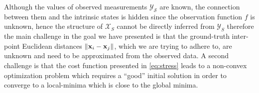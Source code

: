 	Although the values of observed measurements $\mathcal{Y_{S}}$ are known, the connection between them and the intrinsic states is hidden since the observation function $f$ is unknown, hence the structure of $\mathcal{X}_{S}$ cannot be directly inferred from $\mathcal{Y}_{S}$ therefore the main challenge in the goal we have presented is that the ground-truth inter-point Euclidean distances $\left\Vert {\bf x}_{i}-{\bf x}_{j}\right\Vert $, which we are trying to adhere to, are unknown and need to be approximated from the observed data. A second challenge is that the cost function presented in \cref{eq:stress} leads to a non-convex optimization problem which requires a ``good'' initial solution in order to converge to a local-minima which is close to the global minima.